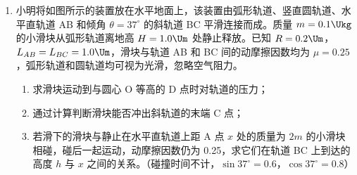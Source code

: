 \documentclass[\gkver]{gaokaozhenti}
\begin{document}
\begin{enumerate}
{（2）结合图乙根据运动学公式有 $v=at_{2}=0.125\times(34-26)\Ums=1\Ums$。

（3）根据图像可知匀速上升的位移 $h_{1}=vt_{1}=1\times26\Um=26\Um$，匀减速上升的位移 $h_{2}=\frac{v}{2}t_{2}=\frac{1}{2}\times8\Um=4\Um$，匀加速上升的位移为总位移的 $\frac{1}{4}$，则匀速上升和减速上升的位移为总位移的 $\frac{3}{4}$，则有 $h_{1}+h_{2}=\frac{3}{4}h$，所以总位移为 $h=40\Um$。
}

\item
小明将如图所示的装置放在水平地面上，该装置由弧形轨道、竖直圆轨道、水平直轨道 AB 和倾角 $\theta=37^\circ$ 的斜轨道 BC 平滑连接而成。质量 $m=0.1\Ukg$ 的小滑块从弧形轨道离地高 $H=1.0\Um$ 处静止释放。已知 $R=0.2\Um$，$L_{AB}=L_{BC}=1.0\Um$，滑块与轨道 AB 和 BC 间的动摩擦因数均为 $\mu=0.25$，弧形轨道和圆轨道均可视为光滑，忽略空气阻力。
\begin{enumerate}
	\item
	求滑块运动到与圆心 O 等高的 D 点时对轨道的压力；
	\item
	通过计算判断滑块能否冲出斜轨道的末端 C 点；
	\item
	若滑下的滑块与静止在水平直轨道上距 A 点 $x$ 处的质量为 $2m$ 的小滑块相碰，碰后一起运动，动摩擦因数仍为 0.25，求它们在轨道 BC 上到达的高度 $h$ 与 $x$ 之间的关系。（碰撞时间不计，$\sin 37^\circ=0.6$，$\cos 37^\circ=0.8$）
\end{enumerate}
\end{enumerate}
\end{document}
